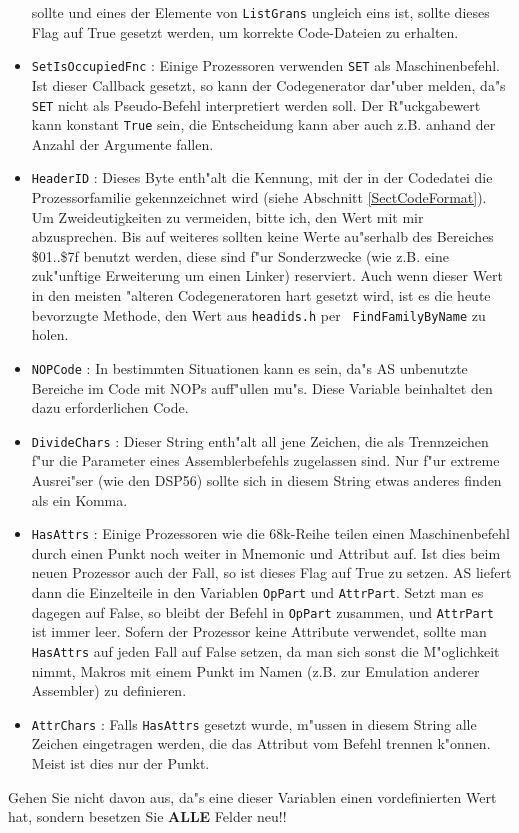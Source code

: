 \documentclass[12pt,a4paper,twoside]{report}
\newcommand{\bb}[1]{{\bf #1}}
\newcommand{\tty}[1]{{\tt #1}}
\begin{document}
\begin{itemize}
{      sollte und eines der Elemente von \tty{ListGrans} ungleich eins ist,
      sollte dieses Flag auf True gesetzt werden, um korrekte Code-Dateien
      zu erhalten.}
\item{\tty{SetIsOccupiedFnc} : Einige Prozessoren verwenden \tty{SET} als
      Maschinenbefehl.  Ist dieser Callback gesetzt, so kann der Codegenerator
      dar"uber melden, da"s \tty{SET} nicht als Pseudo-Befehl interpretiert
      werden soll.  Der R"uckgabewert kann konstant \tty{True} sein, die
      Entscheidung kann aber auch z.B. anhand der Anzahl der Argumente fallen.}
\item{\tty{HeaderID} : Dieses Byte enth"alt die Kennung, mit der in der Codedatei
      die Prozessorfamilie gekennzeichnet wird (siehe Abschnitt
      \ref{SectCodeFormat}).  Um Zweideutigkeiten zu vermeiden,
      bitte ich, den Wert mit mir abzusprechen.  Bis auf weiteres sollten
      keine Werte au"serhalb des Bereiches \$01..\$7f benutzt werden,
      diese sind f"ur Sonderzwecke (wie z.B. eine zuk"unftige Erweiterung
      um einen Linker) reserviert.  Auch wenn dieser Wert in den meisten
      "alteren Codegeneratoren hart gesetzt wird, ist es die heute
      bevorzugte Methode, den Wert aus {\tt headids.h} per {\tt
      FindFamilyByName} zu holen.}
\item{\tty{NOPCode} : In bestimmten Situationen kann es sein, da"s AS unbenutzte
      Bereiche im Code mit NOPs auff"ullen mu"s.  Diese Variable beinhaltet
      den dazu erforderlichen Code.}
\item{\tty{DivideChars} : Dieser String enth"alt all jene Zeichen, die als
      Trennzeichen f"ur die Parameter eines Assemblerbefehls zugelassen
      sind.  Nur f"ur extreme Ausrei"ser (wie den DSP56) sollte sich in
      diesem String etwas anderes finden als ein Komma.}
\item{\tty{HasAttrs} : Einige Prozessoren wie die 68k-Reihe teilen einen
      Maschinenbefehl durch einen Punkt noch weiter in Mnemonic und
      Attribut auf.  Ist dies beim neuen Prozessor auch der Fall, so
      ist dieses Flag auf True zu setzen.  AS liefert dann die Einzelteile
      in den Variablen \tty{OpPart} und \tty{AttrPart}.  Setzt man es
      dagegen auf False, so bleibt der Befehl in \tty{OpPart} zusammen,
      und \tty{AttrPart} ist immer leer.  Sofern der Prozessor keine
      Attribute verwendet, sollte man \tty{HasAttrs} auf jeden Fall auf False
      setzen, da man sich sonst die M"oglichkeit nimmt, Makros mit einem
      Punkt im Namen (z.B. zur Emulation anderer Assembler) zu definieren.}
\item{\tty{AttrChars} : Falls \tty{HasAttrs} gesetzt wurde, m"ussen in diesem
      String alle Zeichen eingetragen werden, die das Attribut vom Befehl
      trennen k"onnen.  Meist ist dies nur der Punkt.}
\end{itemize}
Gehen Sie nicht davon aus, da"s eine dieser Variablen einen vordefinierten
Wert hat, sondern besetzen Sie \bb{ALLE} Felder neu!!
\end{document}
